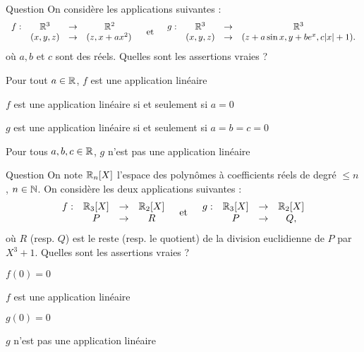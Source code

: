 \begin{multi}[multiple,feedback=
{On vérifie que \(f\) est linéaire si et seulement si \(a=0\) et que \(g\) n'est pas linéaire pour 
tous réels \(a,b\) et \(c\).
}]{Question}
On considère les applications suivantes : 
\[\begin{array}{rccc}f:&\mathbb{R}^3&\to&\mathbb{R}^2\\
& (x,y,z)&\to &(z,x+ax^2) \,  \end{array}  \quad \mbox{et} \quad  \begin{array}{rccc}g:&\mathbb{R}^3&\to&\mathbb{R}^3\\
& (x,y,z)&\to &(z+a\sin x, y+be^x, c|x|+1).\end{array} \] 
où \(a,b\) et \(c\) sont des réels. Quelles sont les assertions vraies ?

    \item Pour tout \(a\in \mathbb{R}\), \(f\) est une application linéaire
    \item* \(f\) est une application linéaire si et seulement si \(a=0\)
    \item \(g\) est une application linéaire si et seulement si \(a=b=c=0\)
    \item* Pour tous \(a,b, c \in \mathbb{R}\), \(g\) n'est pas une application linéaire
\end{multi}


\begin{multi}[multiple,feedback=
{On vérifie que \(f\) et \(g\) sont linéaires.
}]{Question}
On note \(\mathbb{R}_n[X]\) l'espace des polynômes à coefficients réels de degré \(\le n\),  \(n\in \mathbb{N}\). On considère les deux applications suivantes : 
\[\begin{array}{rccc}f:&\mathbb{R}_3[X]&\to&\mathbb{R}_2[X]\\
& P&\to &R \end{array} \quad \mbox{et} \quad 
\begin{array}{rccc}g:&\mathbb{R}_3[X]&\to& \mathbb{R}_2[X]\\
& P&\to &Q,\end{array}\]
où \(R\) (resp. \(Q\)) est le reste (resp. le quotient) de la division euclidienne de \(P\) par \(X^3+1\). Quelles sont les assertions vraies ?

    \item* \(f(0)=0\)
    \item* \(f\) est une application linéaire
    \item* \(g(0)=0\)
    \item \(g\) n'est pas une application linéaire
\end{multi}


